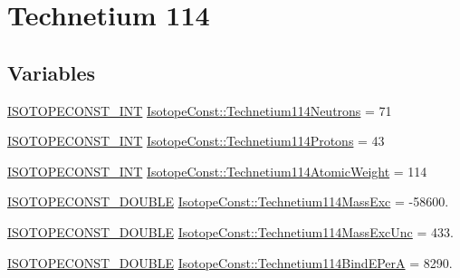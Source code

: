\hypertarget{group___isotope_const-_technetium-_tc114}{}\section{Technetium 114}
\label{group___isotope_const-_technetium-_tc114}
\subsection*{Variables}
\begin{DoxyCompactItemize}
\item 
\mbox{\hyperlink{group___isotope_const-_macros_ga5f18360b3e99483a35c32d789e62621c}{I\+S\+O\+T\+O\+P\+E\+C\+O\+N\+S\+T\+\_\+\+I\+NT}} \mbox{\hyperlink{group___isotope_const-_technetium-_tc114_ga39143a8e83b18f8f6de3d25752b7dfa7}{Isotope\+Const\+::\+Technetium114\+Neutrons}} = 71
\item 
\mbox{\hyperlink{group___isotope_const-_macros_ga5f18360b3e99483a35c32d789e62621c}{I\+S\+O\+T\+O\+P\+E\+C\+O\+N\+S\+T\+\_\+\+I\+NT}} \mbox{\hyperlink{group___isotope_const-_technetium-_tc114_ga1465017c2b8ab406df4c04aa27a873f2}{Isotope\+Const\+::\+Technetium114\+Protons}} = 43
\item 
\mbox{\hyperlink{group___isotope_const-_macros_ga5f18360b3e99483a35c32d789e62621c}{I\+S\+O\+T\+O\+P\+E\+C\+O\+N\+S\+T\+\_\+\+I\+NT}} \mbox{\hyperlink{group___isotope_const-_technetium-_tc114_ga2d4067e3683a3a5e7e07a7a736ad1bfa}{Isotope\+Const\+::\+Technetium114\+Atomic\+Weight}} = 114
\item 
\mbox{\hyperlink{group___isotope_const-_macros_ga8f45a7272ce02c0b4c65c44636ed719a}{I\+S\+O\+T\+O\+P\+E\+C\+O\+N\+S\+T\+\_\+\+D\+O\+U\+B\+LE}} \mbox{\hyperlink{group___isotope_const-_technetium-_tc114_gaeb326e2c68e2a5466dcaea1e2f3ff8e1}{Isotope\+Const\+::\+Technetium114\+Mass\+Exc}} = -\/58600.
\item 
\mbox{\hyperlink{group___isotope_const-_macros_ga8f45a7272ce02c0b4c65c44636ed719a}{I\+S\+O\+T\+O\+P\+E\+C\+O\+N\+S\+T\+\_\+\+D\+O\+U\+B\+LE}} \mbox{\hyperlink{group___isotope_const-_technetium-_tc114_ga093b812b44834eb498f3117b46f502d8}{Isotope\+Const\+::\+Technetium114\+Mass\+Exc\+Unc}} = 433.
\item 
\mbox{\hyperlink{group___isotope_const-_macros_ga8f45a7272ce02c0b4c65c44636ed719a}{I\+S\+O\+T\+O\+P\+E\+C\+O\+N\+S\+T\+\_\+\+D\+O\+U\+B\+LE}} \mbox{\hyperlink{group___isotope_const-_technetium-_tc114_ga669745a9a882065e2579ccd404f3a982}{Isotope\+Const\+::\+Technetium114\+Bind\+E\+PerA}} = 8290.

\end{DoxyCompactItemize}
